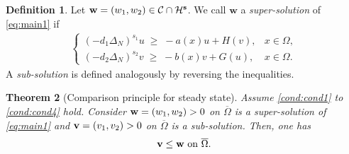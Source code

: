 \documentclass[a4paper,11pt]{amsart}
\newtheorem{theorem}{Theorem}
\theoremstyle{definition}
\newtheorem{definition}[theorem]{Definition}
\def\O{\Omega}
\numberwithin{equation}{section}
\theoremstyle{definition}
\def\O{\Omega}
\begin{document}
\begin{definition}
Let $\textbf{w}=(w_1,w_2)\in \mathcal{C}\cap \mathcal{H}^{\bf s}$.  
We call $\textbf{w}$ a \textit{super-solution} of \eqref{eq:main1} if
\begin{align*}
\begin{cases}
(-d_1\Delta_N)^{s_1} u \;\geq\; -a(x)u + H(v), & x\in \Omega, \\[0.3em]
(-d_2\Delta_N)^{s_2} v \;\geq\; -b(x)v + G(u), & x\in \Omega.
\end{cases}
\end{align*}
A \textit{sub-solution} is defined analogously by reversing the inequalities.
\end{definition}


\begin{theorem}[Comparison principle for steady state]\label{compar:1state}
Assume \ref{cond:cond1} to \ref{cond:cond4} hold. Consider ${\bf w}=(w_1,w_2)>0$ on $\overline{\O}$ is a super-solution of \eqref{eq:main1} and ${\bf v}=(v_1,v_2)>0$ on $\overline{\O}$ is a sub-solution. Then, one has
\begin{align*}
{\bf v}\leq {\bf w} \text{ on }\overline{\O}.
\end{align*}
\end{theorem}
\end{document}
